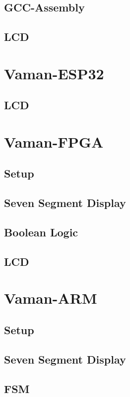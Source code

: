 \documentclass[11pt]{book}
\begin{document}
\section{GCC-Assembly}

\section{LCD}

%
\chapter{Vaman-ESP32}


\section{LCD}

\chapter{Vaman-FPGA}
\section{Setup}

\section{Seven Segment Display}

\section{Boolean Logic}

\section{LCD}

\chapter{Vaman-ARM}
\section{Setup}

\section{Seven Segment Display}

\section{FSM}

%
\end{document}
